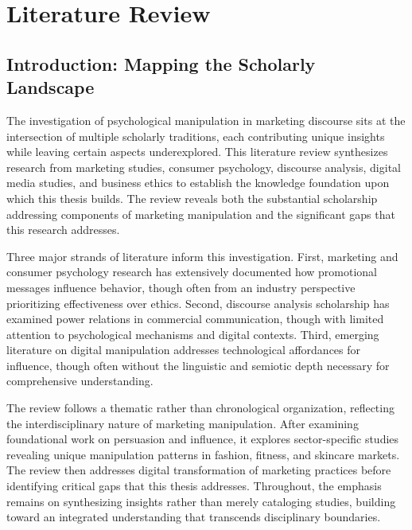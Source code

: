 
\chapter{Literature Review}
\label{ch:literature}

\section{Introduction: Mapping the Scholarly Landscape}
\label{sec:lit_intro}

The investigation of psychological manipulation in marketing discourse sits at the intersection of multiple scholarly traditions, each contributing unique insights while leaving certain aspects underexplored. This literature review synthesizes research from marketing studies, consumer psychology, discourse analysis, digital media studies, and business ethics to establish the knowledge foundation upon which this thesis builds. The review reveals both the substantial scholarship addressing components of marketing manipulation and the significant gaps that this research addresses.

Three major strands of literature inform this investigation. First, marketing and consumer psychology research has extensively documented how promotional messages influence behavior, though often from an industry perspective prioritizing effectiveness over ethics. Second, discourse analysis scholarship has examined power relations in commercial communication, though with limited attention to psychological mechanisms and digital contexts. Third, emerging literature on digital manipulation addresses technological affordances for influence, though often without the linguistic and semiotic depth necessary for comprehensive understanding.

The review follows a thematic rather than chronological organization, reflecting the interdisciplinary nature of marketing manipulation. After examining foundational work on persuasion and influence, it explores sector-specific studies revealing unique manipulation patterns in fashion, fitness, and skincare markets. The review then addresses digital transformation of marketing practices before identifying critical gaps that this thesis addresses. Throughout, the emphasis remains on synthesizing insights rather than merely cataloging studies, building toward an integrated understanding that transcends disciplinary boundaries.

